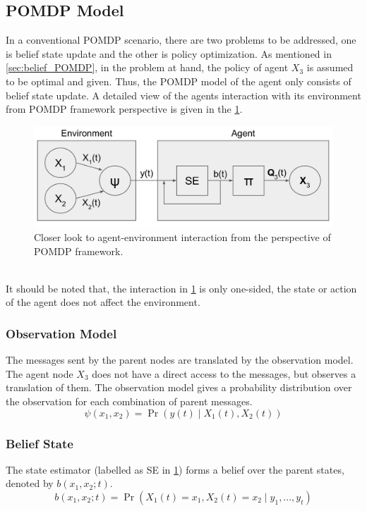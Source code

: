 \subsection{POMDP Model}
In a conventional POMDP scenario, there are two problems to be addressed, one is belief state update and the other is policy optimization. As mentioned in \cref{sec:belief_POMDP}, in the problem at hand, the policy of agent $ X_3 $ is assumed to be optimal and given. Thus, the POMDP model of the agent only consists of belief state update. A detailed view of the agents interaction with its environment from POMDP framework perspective is given in the \cref{fig:POMDP_pers}. \\
\begin{figure}[htb]
	\begin{center}
		\includegraphics[width=.75\textwidth]{figures/POMDP_graph}
		\caption{Closer look to agent-environment interaction from the perspective of POMDP framework.}
		\label{fig:POMDP_pers}
	\end{center}
\end{figure}\\
It should be noted that, the interaction in \cref{fig:POMDP_pers} is only one-sided, the state or action of the agent does not affect the environment.
\subsubsection{Observation Model}
The messages sent by the parent nodes are translated by the observation model. The agent node $ X_3 $ does not have a direct access to the messages, but observes a translation of them. The observation model gives a probability distribution over the observation for each combination of parent messages.
\begin{equation}
\psi(x_1, x_2) = \operatorname{Pr}(y(t) \mid X_{1}(t), X_{2}(t))
\end{equation}

\subsubsection{Belief State}
The state estimator (labelled as SE in \cref{fig:POMDP_pers}) forms a belief over the parent states, denoted by $  b(x_{1}, x_{2}; t) $. 
\begin{equation}
b(x_{1}, x_{2}; t) = \operatorname{Pr}( X_{1}(t) = x_{1},  X_{2}(t) = x_{2}\mid y_{1}, ..., y_{t})
\end{equation}
